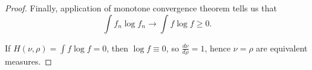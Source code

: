 \begin{itemize}
\begin{proof}
	Finally, application of monotone convergence theorem tells us that
	\[
		\int f_n \log  f_n \to \int  f \log  f \ge 0
	.\] 

	If $H(\nu, \rho) = \int f \log  f = 0$, then $\log f \equiv 0$, so $\frac{d \nu}{d \rho} = 1$, hence $\nu = \rho$ are equivalent measures.
\end{proof}
\end{itemize}

